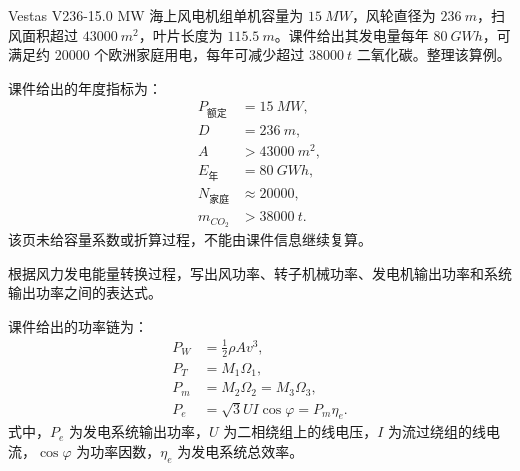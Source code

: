 \begin{problem}[V236-15.0 MW 机组年发电量与减排量]\label{exer:calc_03_wind_p041_01}
Vestas V236-15.0 MW 海上风电机组单机容量为 \(\qty{15}{MW}\)，风轮直径为 \(\qty{236}{m}\)，扫风面积超过 \(\qty{43000}{m^2}\)，叶片长度为 \(\qty{115.5}{m}\)。课件给出其发电量每年 \(\qty{80}{GWh}\)，可满足约 \(\num{20000}\) 个欧洲家庭用电，每年可减少超过 \(\qty{38000}{t}\) 二氧化碳。整理该算例。
\end{problem}

\begin{solution}
课件给出的年度指标为：
\begin{equation*}
\begin{aligned}
P_{\text{额定}} &= \qty{15}{MW},\\
D &= \qty{236}{m},\\
A &> \qty{43000}{m^2},\\
E_{\text{年}} &= \qty{80}{GWh},\\
N_{\text{家庭}} &\approx \num{20000},\\
m_{CO_2} &> \qty{38000}{t}.
\end{aligned}
\end{equation*}
该页未给容量系数或折算过程，不能由课件信息继续复算。
\end{solution}

\begin{problem}[风力发电系统输出功率链]\label{exer:calc_03_wind_p060_01}
根据风力发电能量转换过程，写出风功率、转子机械功率、发电机输出功率和系统输出功率之间的表达式。
\end{problem}

\begin{solution}
课件给出的功率链为：
\begin{equation*}
\begin{aligned}
P_W &= \frac{1}{2}\rho A v^3,\\
P_T &= M_1\Omega_1,\\
P_m &= M_2\Omega_2 = M_3\Omega_3,\\
P_e &= \sqrt{3}UI\cos\varphi = P_m\eta_e.
\end{aligned}
\end{equation*}
式中，\(P_e\) 为发电系统输出功率，\(U\) 为二相绕组上的线电压，\(I\) 为流过绕组的线电流，\(\cos\varphi\) 为功率因数，\(\eta_e\) 为发电系统总效率。
\end{solution}

